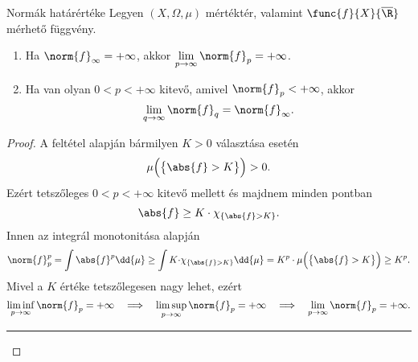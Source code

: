 \documentclass[
]{elteikthesis}[2024/04/26]
\begin{document}
	\newpage
	\begin{theorem}{Normák határértéke}{}
		Legyen \( (X, \Omega, \mu) \) mértéktér, 
		valamint \( \func{f}{X}{\overline{\R}} \) mérhető függvény.
		\begin{enumerate}
			\item\label{eq:lp-norma-határérték-01}
			Ha \( \norm{f}_\infty = +\infty \),
			akkor \( \lim\limits_{p \to \infty} \norm{f}_p = +\infty \).
			
			\item\label{eq:lp-norma-határérték-02}
			Ha van olyan \( 0 < p < +\infty \) kitevő, amivel \( \norm{f}_p < +\infty \), akkor
			\[
				\lim\limits_{q \to \infty} \norm{f}_q = \norm{f}_\infty.
			\]
		\end{enumerate}
	\end{theorem}
	\begin{proof}
		A feltétel alapján bármilyen \( K > 0 \) választása esetén
		\[
			\mu \Bigl( \bigl\{ \abs{f} > K \bigr\} \Bigr) > 0.
		\]
		Ezért tetszőleges \( 0 < p < +\infty \) kitevő mellett és majdnem minden pontban
		\[
			\abs{f} \geq 
			K \cdot \chi_{\{ \abs{f} > K \}}.
		\]
		Innen az integrál monotonitása alapján
		\[
			\norm{f}_p^p = 
			\int \abs{f}^p \dd{\mu} \geq
			\int K {\cdot} \chi_{\{ \abs{f} > K \}} \dd{\mu} =
			K^p \cdot \mu \Bigl( \bigl\{ \abs{f} > K \bigr\} \Bigr) \geq 
			K^p.
		\]
		Mivel a \( K \) értéke tetszőlegesen nagy lehet, ezért
		\[
			\liminf_{p \to \infty} \norm{f}_p = +\infty
			\quad \Longrightarrow \quad
			\limsup_{p \to \infty} \norm{f}_p = +\infty
			\quad \Longrightarrow \quad
			\lim_{p \to \infty} \norm{f}_p = +\infty.
		\]
		
		\vspace{3pt}
		\hrule
		\vspace{9pt}
		

\end{proof}
\end{document}
